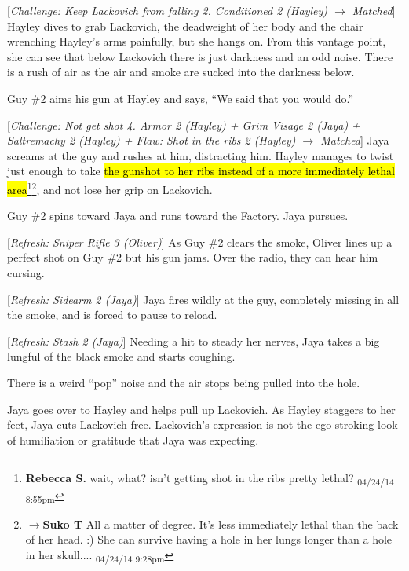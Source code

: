 {[}\textit{Challenge: Keep Lackovich from falling 2.  Conditioned 2 (Hayley) $\rightarrow$ Matched}{]}  Hayley dives to grab Lackovich, the deadweight of her body and the chair wrenching Hayley's arms painfully, but she hangs on.  From this vantage point, she can see that below Lackovich there is just darkness and an odd noise.  There is a rush of air as the air and smoke are sucked into the darkness below.



Guy \#2 aims his gun at Hayley and says, ``We said that you would do.''



{[}\textit{Challenge: Not get shot 4.  Armor 2 (Hayley) + Grim Visage 2 (Jaya) + Saltremachy 2 (Hayley) + Flaw: Shot in the ribs 2 (Hayley) $\rightarrow$ Matched}{]}  Jaya screams at the guy and rushes at him, distracting him.  Hayley manages to twist just enough to take \hl{the gunshot to her ribs instead of a more immediately lethal area}\footnote{\textbf{Rebecca S. }wait, what? isn't getting shot in the ribs pretty lethal? \textsubscript{04/24/14 8:55pm}}\footnote{$\rightarrow$\textbf{Suko T }All a matter of degree.  It's less immediately lethal than the back of her head. :)  She can survive having a hole in her lungs longer than a hole in her skull.... \textsubscript{04/24/14 9:28pm}}, and not lose her grip on Lackovich.



Guy \#2 spins toward Jaya and runs toward the Factory.  Jaya pursues.



{[}\textit{Refresh: Sniper Rifle 3 (Oliver)}{]}  As Guy \#2 clears the smoke, Oliver lines up a perfect shot on Guy \#2 but his gun jams.  Over the radio, they can hear him cursing.



{[}\textit{Refresh: Sidearm 2 (Jaya)}{]}  Jaya fires wildly at the guy, completely missing in all the smoke, and is forced to pause to reload.



{[}\textit{Refresh: Stash 2 (Jaya)}{]}  Needing a hit to steady her nerves, Jaya takes a big lungful of the black smoke and starts coughing.



There is a weird ``pop'' noise and the air stops being pulled into the hole.



Jaya goes over to Hayley and helps pull up Lackovich.  As Hayley staggers to her feet, Jaya cuts Lackovich free.  Lackovich's expression is not the ego-stroking look of humiliation or gratitude that Jaya was expecting.



